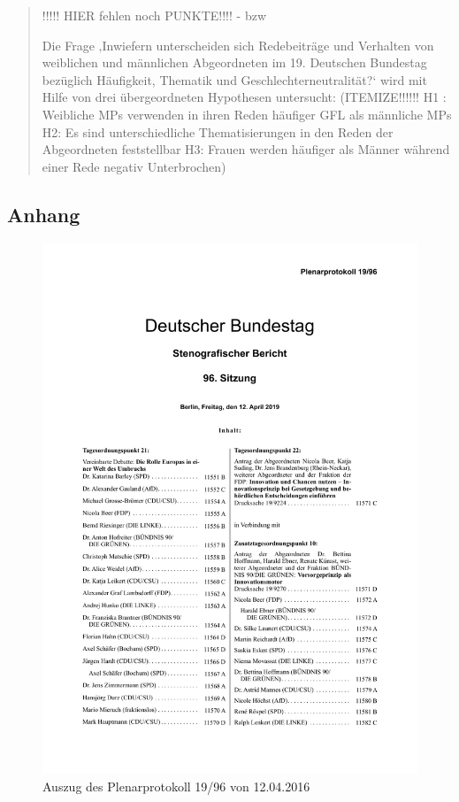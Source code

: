 \documentclass[12pt, 
    twoside=false, 
    bibliography=totoc, 
    numbers=endperiod, 
    headings=normal, 
    toc=chapterentrydotfill
    ]{scrbook}
\begin{document}
\begin{quote}
!!!!! HIER fehlen noch  PUNKTE!!!! - bzw


Die Frage ‚Inwiefern unterscheiden sich Redebeiträge und Verhalten von weiblichen und männlichen Abgeordneten im 19. Deutschen Bundestag bezüglich Häufigkeit, Thematik und Geschlechterneutralität?‘ wird mit Hilfe von drei übergeordneten Hypothesen untersucht:
(ITEMIZE!!!!!! 
H1 : Weibliche MPs verwenden in ihren Reden häufiger GFL als männliche MPs
H2: Es sind unterschiedliche Thematisierungen in den Reden der Abgeordneten feststellbar
H3: Frauen werden häufiger als Männer während einer Rede negativ Unterbrochen)






\end{quote}



\begin{appendices}
\chapter{Anhang}

\begin{figure}[H]
    \centering
    \includegraphics[page=14,scale=0.7]{images/protokoll_beispiel.pdf}
    \caption{Auszug des Plenarprotokoll 19/96 von 12.04.2016}
    \label{fig:protokoll_bsp}
\end{figure}



\end{appendices}
\end{document}
